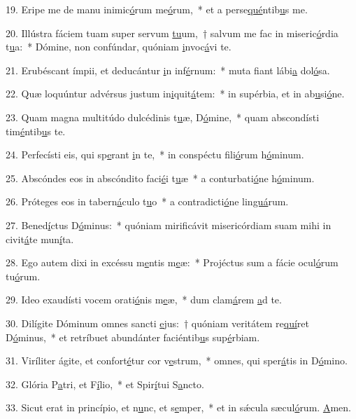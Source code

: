 19. Eripe me de manu inimic\uline{ó}rum me\uline{ó}rum,~* et a perse\uline{qué}ntib\uline{u}s me.\par 
20. Illústra fáciem tuam super servum \uline{tu}um,~† salvum me fac in miseric\uline{ó}rdia t\uline{u}a:~* Dómine, non confúndar, quóniam \uline{i}nvoc\uline{á}vi te.\par 
21. Erubéscant ímpii, et deducántur \uline{i}n inf\uline{é}rnum:~* muta fiant lábi\uline{a} dol\uline{ó}sa.\par 
22. Quæ loquúntur advérsus justum in\uline{i}quit\uline{á}tem:~* in supérbia, et in ab\uline{u}si\uline{ó}ne.\par 
23. Quam magna multitúdo dulcédinis t\uline{u}æ, D\uline{ó}mine,~* quam abscondísti tim\uline{é}ntib\uline{u}s te.\par 
24. Perfecísti eis, qui sp\uline{e}rant \uline{i}n te,~* in conspéctu fili\uline{ó}rum h\uline{ó}minum.\par 
25. Abscóndes eos in abscóndito faci\uline{é}i t\uline{u}æ~* a conturbati\uline{ó}ne h\uline{ó}minum.\par 
26. Próteges eos in tabern\uline{á}culo t\uline{u}o~* a contradicti\uline{ó}ne lin\uline{guá}rum.\par 
27. Bened\uline{í}ctus D\uline{ó}minus:~* quóniam mirificávit misericórdiam suam mihi in civit\uline{á}te mun\uline{í}ta.\par 
28. Ego autem dixi in excéssu m\uline{e}ntis m\uline{e}æ:~* Projéctus sum a fácie ocul\uline{ó}rum tu\uline{ó}rum.\par 
29. Ideo exaudísti vocem orati\uline{ó}nis m\uline{e}æ,~* dum clam\uline{á}rem \uline{a}d te.\par 
30. Dilígite Dóminum omnes sancti \uline{e}jus:~† quóniam veritátem re\uline{quí}ret D\uline{ó}minus,~* et retríbuet abundánter faciéntib\uline{u}s sup\uline{é}rbiam.\par 
31. Viríliter ágite, et confort\uline{é}tur cor v\uline{e}strum,~* omnes, qui sper\uline{á}tis in D\uline{ó}mino.\par 
32. Glória P\uline{a}tri, et F\uline{í}lio,~* et Spir\uline{í}tui S\uline{a}ncto.\par 
33. Sicut erat in princípio, et n\uline{u}nc, et s\uline{e}mper,~* et in sǽcula sæcul\uline{ó}rum. \uline{A}men.\par 
